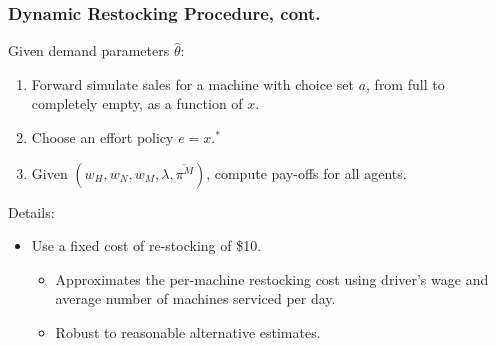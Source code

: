 \documentclass[aspectratio=169,11pt]{beamer}
\begin{document}
\begin{frame}
\frametitle{Dynamic Restocking Procedure, cont.}
Given demand parameters $\hat{\theta}$:
\begin{enumerate}
\item Forward simulate sales for a machine with choice set $a$, from full to completely empty, as a function of $x$.
\item Choose an effort policy $e = x.^{*}$
\item Given $(w_H, w_N,w_M,\lambda,\overline{\pi^M})$, compute pay-offs for all agents.
\end{enumerate}
Details:
\begin{itemize}
\item Use a fixed cost of re-stocking of \$10. 
	\begin{itemize}
	\item Approximates the per-machine restocking cost using driver's wage and average number of machines serviced per day.
	\item Robust to reasonable alternative estimates.
	\end{itemize}
\end{itemize}
\end{frame}
\end{document}
